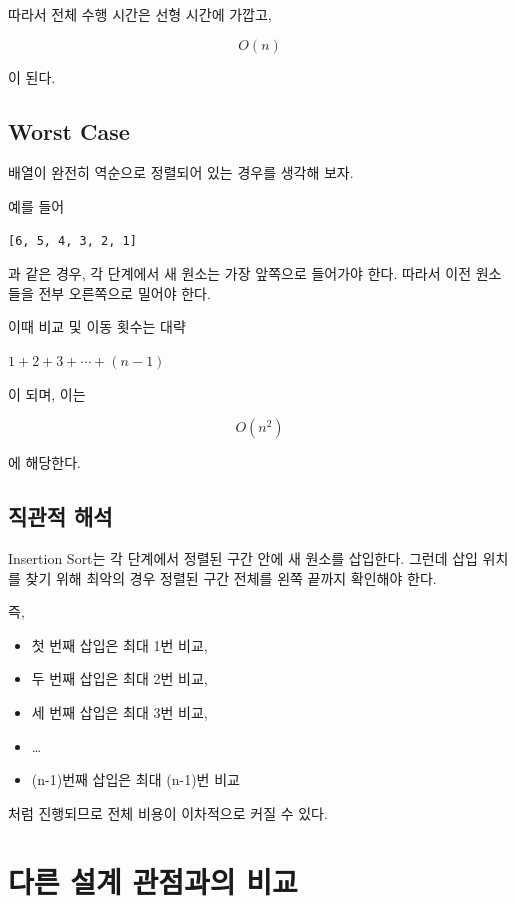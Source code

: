 \documentclass[
  korean,
]{article}
\providecommand{\tightlist}{%
  \setlength{\itemsep}{0pt}\setlength{\parskip}{0pt}}
\begin{document}
따라서 전체 수행 시간은 선형 시간에 가깝고,

\[
O(n)
\]

이 된다.

\subsection{Worst Case}\label{worst-case}

배열이 완전히 역순으로 정렬되어 있는 경우를 생각해 보자.

예를 들어

\begin{verbatim}
[6, 5, 4, 3, 2, 1]
\end{verbatim}

과 같은 경우, 각 단계에서 새 원소는 가장 앞쪽으로 들어가야 한다. 따라서
이전 원소들을 전부 오른쪽으로 밀어야 한다.

이때 비교 및 이동 횟수는 대략

\(1 + 2 + 3 + \cdots + (n−1)\)

이 되며, 이는

\[
O(n^2)
\]

에 해당한다.

\subsection{직관적 해석}\label{uxc9c1uxad00uxc801-uxd574uxc11d}

Insertion Sort는 각 단계에서 정렬된 구간 안에 새 원소를 삽입한다. 그런데
삽입 위치를 찾기 위해 최악의 경우 정렬된 구간 전체를 왼쪽 끝까지
확인해야 한다.

즉,

\begin{itemize}
\tightlist
\item
  첫 번째 삽입은 최대 1번 비교,
\item
  두 번째 삽입은 최대 2번 비교,
\item
  세 번째 삽입은 최대 3번 비교,
\item
  \ldots{}
\item
  (n-1)번째 삽입은 최대 (n-1)번 비교
\end{itemize}

처럼 진행되므로 전체 비용이 이차적으로 커질 수 있다.

\section{다른 설계 관점과의
비교}\label{uxb2e4uxb978-uxc124uxacc4-uxad00uxc810uxacfcuxc758-uxbe44uxad50}
\end{document}
